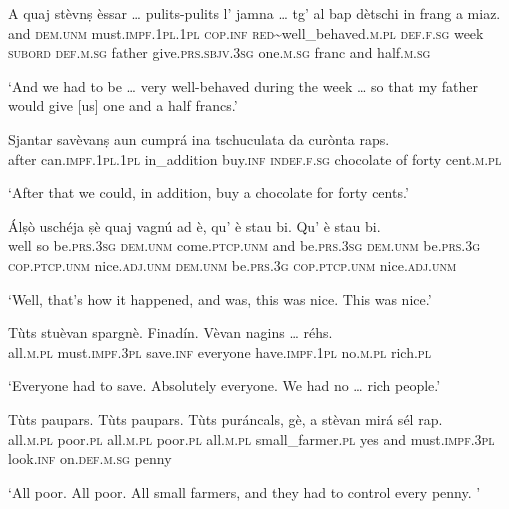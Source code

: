 \begin{linenumbers}
\gll    A quaj stèvnṣ èssar … pulits-pulits l’ jamna … tg’ al bap dètschi\footnotemark{} in frang a miaz.\\
and \textsc{dem.unm} must.\textsc{impf.1pl.1pl} \textsc{cop.inf} {} \textsc{red}\textasciitilde{well\_behaved}.\textsc{m.pl} \textsc{def.f.sg} week {}  \textsc{subord} \textsc{def.m.sg} father  give.\textsc{prs.sbjv.3sg} one.\textsc{m.sg} franc and half.\textsc{m.sg}\\
\end{linenumbers}
\medskip
\glt `And we had to be … very well-behaved during the week … so that my father would give [us] one and a half francs.'
\medskip

\begin{linenumbers}
\gll    Sjantar savèvanṣ aun cumprá ina tschuculata da curònta raps.\\
after can.\textsc{impf.1pl.1pl} in\_addition buy.\textsc{inf} \textsc{indef.f.sg} chocolate of forty  cent.\textsc{m.pl}\\
\end{linenumbers}
\medskip
\glt `After that we could, in addition, buy a chocolate for forty cents.'
\medskip

\begin{linenumbers}
\gll    Álṣò uschéja ṣè quaj vagnú ad è, qu’ è stau bi. Qu’ è stau bi. \\
well so be.\textsc{prs.3sg} \textsc{dem.unm} come.\textsc{ptcp.unm} and be.\textsc{prs.3sg} \textsc{dem.unm} be.\textsc{prs.3g} \textsc{cop.ptcp.unm}  nice.\textsc{adj.unm} \textsc{dem.unm} be.\textsc{prs.3g} \textsc{cop.ptcp.unm}  nice.\textsc{adj.unm} \\
\end{linenumbers}
\medskip
\glt `Well, that’s how it happened, and was, this was nice. This was nice.'
\medskip

\begin{linenumbers}
\gll    Tùts stuèvan spargnè. Finadín. Vèvan nagins … réhs.\\
 all.\textsc{m.pl} must.\textsc{impf.3pl} save.\textsc{inf} everyone have.\textsc{impf.1pl} no.\textsc{m.pl} {} rich.\textsc{pl}\\
\end{linenumbers}
\medskip
\glt `Everyone had to save. Absolutely everyone. We had no … rich people.'
\medskip

\begin{linenumbers}
\gll    Tùts paupars. Tùts paupars. Tùts puráncals, gè, a stèvan mirá sél rap.\\
 all.\textsc{m.pl} poor.\textsc{pl} all.\textsc{m.pl} poor.\textsc{pl}  all.\textsc{m.pl} small\_farmer.\textsc{pl} yes and must.\textsc{impf.3pl} look.\textsc{inf} on.\textsc{def.m.sg} penny\\
\end{linenumbers}
\medskip
\glt `All poor. All poor. All small farmers, and they had to control every penny. '
\medskip

